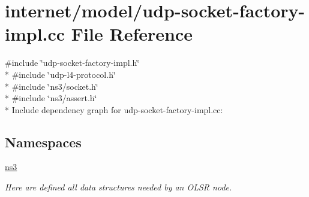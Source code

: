 \hypertarget{udp-socket-factory-impl_8cc}{}\section{internet/model/udp-\/socket-\/factory-\/impl.cc File Reference}
\label{udp-socket-factory-impl_8cc}
{\ttfamily \#include \char`\"{}udp-\/socket-\/factory-\/impl.\+h\char`\"{}}\\*
{\ttfamily \#include \char`\"{}udp-\/l4-\/protocol.\+h\char`\"{}}\\*
{\ttfamily \#include \char`\"{}ns3/socket.\+h\char`\"{}}\\*
{\ttfamily \#include \char`\"{}ns3/assert.\+h\char`\"{}}\\*
Include dependency graph for udp-\/socket-\/factory-\/impl.cc\+:
\subsection*{Namespaces}
\begin{DoxyCompactItemize}
\item 
 \hyperlink{namespacens3}{ns3}
\begin{DoxyCompactList}\small\item\em Here are defined all data structures needed by an O\+L\+SR node. \end{DoxyCompactList}\end{DoxyCompactItemize}

